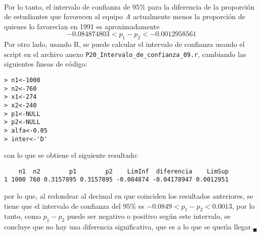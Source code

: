 \begin{solucion}
\begin{eqnarray*}
 \end{eqnarray*}
 Por lo tanto, el intervalo de confianza de $95\%$ para la diferencia de la proporci\'on de estudiantes que favorecen al equipo \textit{A} actualmente menos la proporci\'on de quienes lo favorec\'{\i}an en 1991 es aproximadamente
 \begin{equation*}
  -0.084874803 < p_1 - p_2 < -0.0012958561
 \end{equation*}
 Por otro lado, usando R, se puede calcular el intervalo de confianza usando el script en el archivo anexo \texttt{P20\_Intervalo\_de\_confianza\_09.r}, cambiando las siguientes l\'{\i}neas de c\'odigo:
 \begin{verbatim}
> n1<-1000
> n2<-760
> x1<-274
> x2<-240
> p1<-NULL
> p2<-NULL
> alfa<-0.05
> inter<-'D'
 \end{verbatim}
 \vspace{-0.5cm}
 con lo que se obtiene el siguiente resultado:
 \begin{verbatim}
    n1  n2        p1        p2    LimInf  diferencia    LimSup
1 1000 760 0.3157895 0.3157895 -0.084874 -0.04178947 0.0012951
 \end{verbatim}
 \vspace{-0.5cm}
 por lo que, al redondear al decimal en que coinciden los resultados anteriores, se tiene que el intervalo de confianza del $95\%$ es $-0.0849 < p_1 - p_2 < 0.0013$, por lo tanto, como $p_1 - p_2$ puede ser negativo o positivo seg\'un este intervalo, se concluye que no hay una diferencia significativa, que es a lo que se quer\'{\i}a llegar.${}_{\blacksquare}$
\end{solucion}
